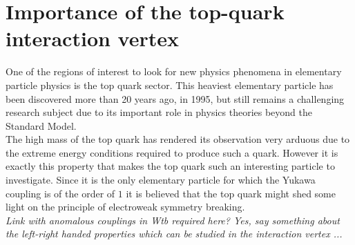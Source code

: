\section{Importance of the top-quark interaction vertex} \label{sec::TopQuarkPhysics}
One of the regions of interest to look for new physics phenomena in elementary particle physics is the top quark sector. This heaviest elementary particle has been discovered more than 20 years ago, in 1995, but still remains a challenging research subject due to its important role in physics theories beyond the Standard Model. 
\\
The high mass of the top quark has rendered its observation very arduous due to the extreme energy conditions required to produce such a quark. 
However it is exactly this property that makes the top quark such an interesting particle to investigate.
Since it is the only elementary particle for which the Yukawa coupling is of the order of $1$ it is believed that the top quark might shed some light on the principle of electroweak symmetry breaking.
\\
\textit{Link with anomalous couplings in Wtb required here? Yes, say something about the left-right handed properties which can be studied in the interaction vertex ...}
%

